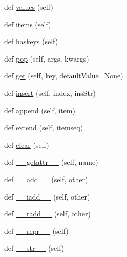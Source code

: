 \begin{DoxyCompactItemize}
\item 
def \hyperlink{classpip_1_1__vendor_1_1pyparsing_1_1ParseResults_aadf8bd3b43b8adad0b8aa9f4a4ea1041}{values} (self)
\item 
def \hyperlink{classpip_1_1__vendor_1_1pyparsing_1_1ParseResults_a5e38a45b5f9f2ab7750435c9cc83e119}{items} (self)
\item 
def \hyperlink{classpip_1_1__vendor_1_1pyparsing_1_1ParseResults_a3471adb863f4e23849c480348f19cba0}{haskeys} (self)
\item 
def \hyperlink{classpip_1_1__vendor_1_1pyparsing_1_1ParseResults_a09dcb25b39f7a1434cef2703a625dcba}{pop} (self, args, kwargs)
\item 
def \hyperlink{classpip_1_1__vendor_1_1pyparsing_1_1ParseResults_a4b1f1a59eee38d7114c9f5dfe95e6116}{get} (self, key, default\+Value=None)
\item 
def \hyperlink{classpip_1_1__vendor_1_1pyparsing_1_1ParseResults_ac1af53822eb92b36a8289d91ab77240f}{insert} (self, index, ins\+Str)
\item 
def \hyperlink{classpip_1_1__vendor_1_1pyparsing_1_1ParseResults_a31699d5a98e62c36e2701d0d721a6e1c}{append} (self, item)
\item 
def \hyperlink{classpip_1_1__vendor_1_1pyparsing_1_1ParseResults_acd6c647ae66379e661f5c348d714e0e9}{extend} (self, itemseq)
\item 
def \hyperlink{classpip_1_1__vendor_1_1pyparsing_1_1ParseResults_ab6e049e34b90004c1d59069da7a5cc08}{clear} (self)
\item 
def \hyperlink{classpip_1_1__vendor_1_1pyparsing_1_1ParseResults_a9e861169fd75bed3c4c2cbc4846d7146}{\+\_\+\+\_\+getattr\+\_\+\+\_\+} (self, name)
\item 
def \hyperlink{classpip_1_1__vendor_1_1pyparsing_1_1ParseResults_a1cf710e23ead4a1e3a2bec462858ad14}{\+\_\+\+\_\+add\+\_\+\+\_\+} (self, other)
\item 
def \hyperlink{classpip_1_1__vendor_1_1pyparsing_1_1ParseResults_a41b315965bd32208e7c91ea7bf5c5e7c}{\+\_\+\+\_\+iadd\+\_\+\+\_\+} (self, other)
\item 
def \hyperlink{classpip_1_1__vendor_1_1pyparsing_1_1ParseResults_ac1658548e4a901cf84baeb5620e58782}{\+\_\+\+\_\+radd\+\_\+\+\_\+} (self, other)
\item 
def \hyperlink{classpip_1_1__vendor_1_1pyparsing_1_1ParseResults_a67323a51c948326f9d8e642903f4baf8}{\+\_\+\+\_\+repr\+\_\+\+\_\+} (self)
\item 
def \hyperlink{classpip_1_1__vendor_1_1pyparsing_1_1ParseResults_ac40e8adec58de458c2803f32f4e67fc0}{\+\_\+\+\_\+str\+\_\+\+\_\+} (self)

\end{DoxyCompactItemize}

